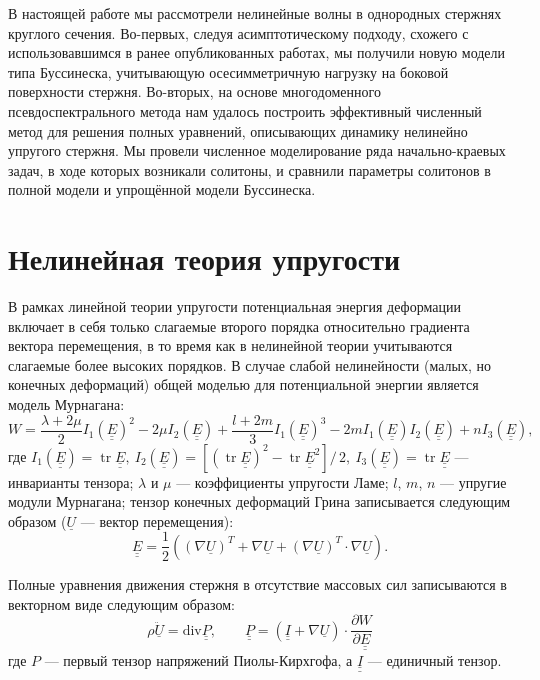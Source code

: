 \documentclass[12pt, a4paper]{article}
\DeclareMathOperator{\trace}{tr}
\newcommand{\lb}{\left (}
\newcommand{\rb}{\right )}
\newcommand{\lsq}{\left [}
\newcommand{\rsq}{\right ]}
\newcommand{\vect}[1]{\underline{#1}}
\newcommand{\tens}[1]{\underline{\underline{#1}}}
\newcommand{\divg}{\text{div}}
\newcommand{\pdiff}[2]{\frac{\partial #1}{\partial #2}}
\begin{document}
В настоящей работе мы рассмотрели нелинейные волны в однородных стержнях круглого сечения. Во-первых, следуя асимптотическому подходу, схожего с использовавшимся в ранее опубликованных работах, мы получили новую модели типа Буссинеска, учитывающую осесимметричную нагрузку на боковой поверхности стержня. Во-вторых, на основе многодоменного псевдоспектрального метода нам удалось построить эффективный численный метод для решения полных уравнений, описывающих динамику нелинейно упругого стержня. Мы провели численное моделирование ряда начально-краевых задач, в ходе которых возникали солитоны, и сравнили параметры солитонов в полной модели и упрощённой модели Буссинеска.


\section{Нелинейная теория упругости}
В рамках линейной теории упругости потенциальная энергия деформации включает в себя только слагаемые второго порядка относительно градиента вектора перемещения, в то время как в нелинейной теории учитываются слагаемые более высоких порядков. В случае слабой нелинейности (малых, но конечных деформаций) общей моделью для потенциальной энергии является модель Мурнагана:
\begin{equation}\label{murnaghan}
W = \frac{\lambda + 2\mu}{2}I_1(\tens{E})^2 - 2\mu I_2(\tens{E}) + \frac{l+2m}{3}I_1(\tens{E})^3 - 2m I_1(\tens{E}) I_2(\tens{E}) + n I_3(\tens{E}),
\end{equation}
где $I_1(\tens{E}) = \trace \tens{E},\  I_2(\tens{E}) = \lsq(\trace \tens{E})^2 - \trace \tens{E}^2\rsq/\,2,\ I_3(\tens{E}) = \trace \tens{E}$ --- инварианты тензора; $\lambda$ и $\mu$ --- коэффициенты упругости Ламе; $l$, $m$, $n$ --- упругие модули Мурнагана; тензор конечных деформаций Грина записывается следующим образом ($\vect{U}$ --- вектор перемещения):
\begin{equation}\label{1_strain}
\tens{E} = \frac12 \lb(\nabla\vect{U})^T + \nabla\vect{U} + (\nabla\vect{U})^T\cdot\nabla\vect{U}\rb.
\end{equation}

Полные уравнения движения стержня в отсутствие массовых сил записываются в векторном виде следующим образом:
\begin{equation}\label{full_eqns}
\rho\ddot{\vect{U}} = \divg\tens{P}, \qquad \tens{P} = (\tens{I} + \nabla\vect{U}) \cdot \pdiff{W}{\tens{E}}
\end{equation}
где $P$ --- первый тензор напряжений Пиолы-Кирхгофа, а $\tens{I}$ --- единичный тензор.
\end{document}
